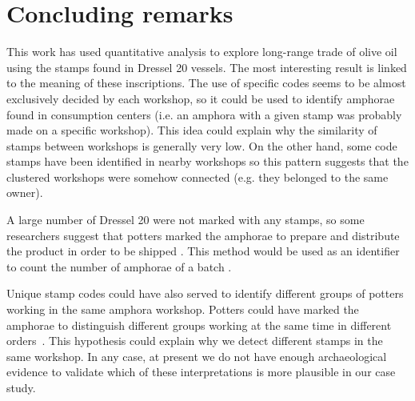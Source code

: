 \documentclass[review]{elsarticle}
\newcommand{\memo}[2]{\textcolor{#1}{#2}}
\newcommand{\xavi}[1]{\memo{magenta}{XRC: #1\\}}
\begin{document}


\section{Concluding remarks}

This work has used quantitative analysis to explore long-range trade of olive oil using the stamps found in Dressel 20 vessels. The most interesting result is linked to the meaning of these inscriptions. The use of specific codes seems to be almost exclusively decided by each workshop, so it could be used to identify amphorae found in consumption centers (i.e. an amphora with a given stamp was probably made on a specific workshop). This idea could explain why the similarity of stamps between workshops is generally very low. On the other hand, some code stamps have been identified in nearby workshops so this pattern suggests that the clustered workshops were somehow connected (e.g. they belonged to the same owner).



A large number of Dressel 20 were not marked with any stamps, so some researchers suggest that potters marked the amphorae to prepare and distribute the product in order to be shipped \citep{berni_millet_epigrafianforica_2008}. This method would be used as an identifier to count the number of amphorae of a batch \citep{juanmorostesis}. 

Unique stamp codes could have also served to identify different groups of potters working in the same amphora workshop. Potters could have marked the amphorae to distinguish different groups working at the same time in different orders~\citep{li_crossbows_2014}. This hypothesis could explain why we detect different stamps in the same workshop. In any case, at present we do not have enough archaeological evidence to validate which of these interpretations is more plausible in our case study.
\end{document}
